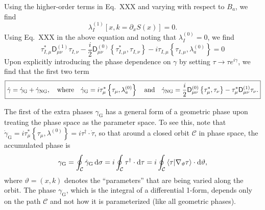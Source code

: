 Using the higher-order terms in Eq.~XXX and varying with respect to $B_{a}$, we find
%
\begin{equation}
  \lambda_{I}^{(1)}\left[x, k=\partial_{x}S(x)\right] = 0.
\end{equation}
%
Using Eq.~XXX in the above equation and noting that $\lambda_{I}^{(0)} = 0$, we find
%
\begin{equation}
\tau_{I,\mu}^{*}\mathsf{D}_{\mu\nu}^{(1)}\tau_{I,\nu} - \frac{i}{2}\mathsf{D}^{(0)}_{\mu\nu}\left\{\tau_{I,\mu}^{*}, \tau_{I,\nu}\right\}
  - i\tau_{I,\mu}\left\{\tau_{I,\mu}, \lambda^{(0)}_{a}\right\} = 0
\end{equation}
%
Upon explicitly introducing the phase dependence on $\gamma$ by setting $\tau \to \tau e^{i\gamma}$, we find that the first two term
%
\begin{equation}\boxed{%
  \dot{\gamma} = \dot{\gamma}_{\text{G}} + \dot{\gamma}_{\text{NG}},
  \quad\text{where}\quad
  \dot{\gamma}_{\text{G}} = i\tau_{\mu}^{*}\left\{\tau_{\mu}, \lambda^{(0)}_{a}\right\}
  \quad\text{and}\quad
\dot{\gamma}_{\text{NG}} = \frac{i}{2}\mathsf{D}^{(0)}_{\mu\nu}\left\{\tau_{\mu}^{*}, \tau_{\nu}\right\} - \tau_{\mu}^{*}\mathsf{D}_{\mu\nu}^{(1)}\tau_{\nu}.}
\end{equation}
%

The first of the extra phases $\gamma_{\text{G}}$ has a general form of a geometric phase upon treating the phase space as the parameter space.
To see this, note that $\dot{\gamma}_{\text{G}} = i\tau^{*}_{\mu}\left\{\tau_{\mu},\lambda^{(0)}\right\} = i\tau^{\dagger}\cdot\dot{\tau}$, so that around a closed orbit $\mathcal{C}$ in phase space, the accumulated phase is
%
\begin{equation}
\gamma_{\text{G}}
= \oint_{\mathcal{C}} \dot{\gamma}_{\text{G}}\,\mathrm{d}{\sigma}
= i\oint_{\mathcal{C}} \tau^{\dagger}\cdot\mathrm{d}{\tau}
= i\oint_{\mathcal{C}} \mathinner{\langle{\tau |\nabla_{\vartheta}\tau}\rangle}
\cdot\mathrm{d}\vartheta,
\end{equation}
%
where $\vartheta = (x, k)$ denotes the ``parameters'' that are being varied along the orbit.
The phase $\gamma_{\text{G}}$, which is the integral of a differential 1-form, depends only on the path $\mathcal{C}$ and not how it is parameterized (like all geometric phases).

